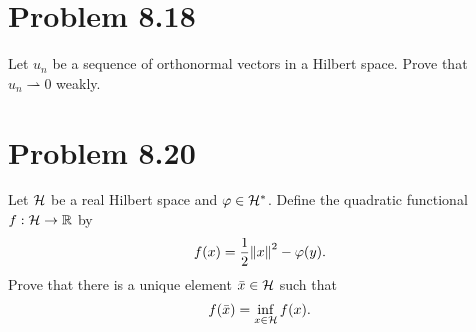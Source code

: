 \newpage
\section{Problem 8.18}
Let $u_n$ be a sequence of orthonormal vectors in a Hilbert space. Prove that $u_n \rightharpoonup 0$ weakly.  


\newpage
\section{Problem 8.20}
\newcommand{\xbar}{\Bar{x}}
Let $\mathcal{H}$ be a real Hilbert space and $\varphi \in \mathcal{H}^{*}$. Define the quadratic functional $f: \mathcal{H} \rightarrow \mathbb{R}$ by 
\[f(x) = \frac{1}{2}\norm{x}^2 - \varphi(y).\]
Prove that there is a unique element $\xbar \in \scH$ such that 
\[f(\xbar) = \inf_{x \in \scH} f(x).\]


